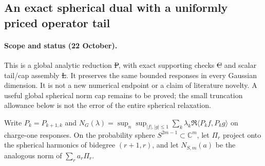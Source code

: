 \subsection{An exact spherical dual with a uniformly priced operator tail}
\label{sec:spherical-dual-transfer-20261022}

\paragraph{Scope and status (22 October).}
This is a global analytic reduction \st{P}, with exact supporting checks
\st{C} and scalar tail/cap assembly \st{L}. It preserves the same bounded
responses in every Gaussian dimension. It is not a new numerical endpoint
or a claim of literature novelty. A useful global spherical norm cap
remains to be proved; the small truncation allowance below is not the
error of the entire spherical relaxation.

Write $P_k=P_{k+1,k}$ and
$N_G(\lambda)=\sup_n\sup_{|f|,|g|\le1}
\sum_k\lambda_k\Re\langle P_kf,P_kg\rangle$ on charge-one responses.
On the probability sphere $S^{2m-1}\subset\mathbb C^m$, let $\Pi_r$
project onto the spherical harmonics of bidegree $(r+1,r)$, and let
$N_{S,m}(a)$ be the analogous norm of $\sum_r a_r\Pi_r$.

